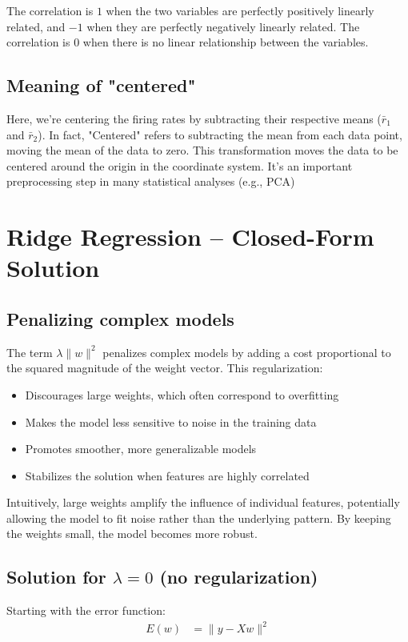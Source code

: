 \documentclass{article}
\begin{document}
The correlation is $1$ when the two variables are perfectly positively linearly related, and $-1$ when they are perfectly negatively linearly related. The correlation is $0$ when there is no linear relationship between the variables.

\subsection{Meaning of "centered"}
Here, we're centering the firing rates by subtracting their respective means ($\bar{r}_1$ and $\bar{r}_2$). In fact, "Centered" refers to subtracting the mean from each data point, moving the mean of the data to zero. This transformation moves the data to be centered around the origin in the coordinate system. It's an important preprocessing step in many statistical analyses (e.g., PCA)

\section{Ridge Regression – Closed-Form Solution}

\subsection{Penalizing complex models}
The term $\lambda\|w\|^2$ penalizes complex models by adding a cost proportional to the squared magnitude of the weight vector. This regularization:

\begin{itemize}
\item Discourages large weights, which often correspond to overfitting
\item Makes the model less sensitive to noise in the training data
\item Promotes smoother, more generalizable models
\item Stabilizes the solution when features are highly correlated
\end{itemize}

Intuitively, large weights amplify the influence of individual features, potentially allowing the model to fit noise rather than the underlying pattern. By keeping the weights small, the model becomes more robust.

\subsection{Solution for $\lambda = 0$ (no regularization)}
Starting with the error function:
\begin{align}
E(w) &= \|y - Xw\|^2
\end{align}
\end{document}
